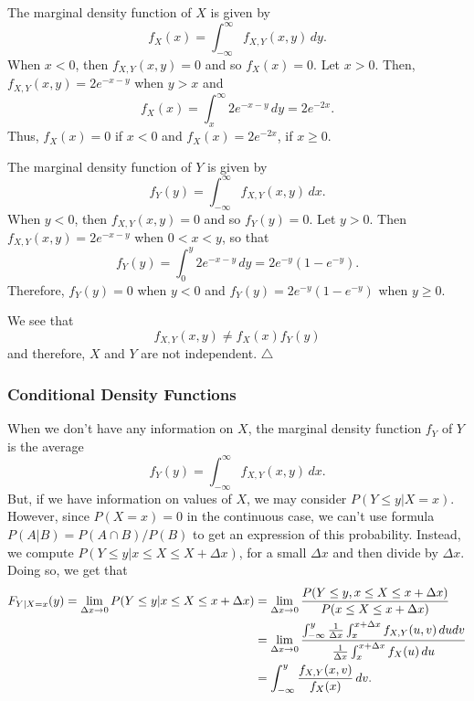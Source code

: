\begin{sol*}
The marginal density function of $X$ is given by
    \[
        f_X (x) = \int_{-\infty}^\infty f_{X, Y} (x, y) \, dy .
    \]
When $x < 0$, then $f_{X, Y} (x, y) = 0$ and so $f_X (x) = 0$. Let $x > 0$. Then, $f_{X, Y} (x, y) = 2 e^{-x - y}$ when $y > x$ and
    \[
        f_X (x) = \int_x^\infty 2e^{-x - y} \, dy = 2e^{-2x} .
    \]
Thus, $f_X (x) = 0$ if $x < 0$ and $f_X (x) = 2e^{-2x}$, if $x \geq 0$. 

The marginal density function of $Y$ is given by
    \[
        f_Y (y) = \int_{-\infty}^\infty f_{X, Y} (x, y) \, dx .
    \]
When $y < 0$, then $f_{X, Y} (x, y) = 0$ and so $f_Y (y) = 0$. Let $y > 0$. Then $f_{X, Y} (x, y) = 2e^{-x - y}$ when $0 < x < y$, so that
    \[
        f_Y (y) = \int_0^y 2e^{-x - y} \, dy = 2e^{-y} (1 - e^{-y} ) .
    \]
Therefore, $f_Y (y) = 0$ when $y < 0$ and $f_Y (y) = 2e^{-y} (1 - e^{-y})$ when $y \geq 0$. 

We see that
    \[
        f_{X, Y} (x, y) \neq f_X (x) f_Y (y)
    \]
and therefore, $X$ and $Y$ are not independent. \hfill $\triangle$
\end{sol*}

\subsubsection*{Conditional Density Functions}
When we don't have any information on $X$, the marginal density function $f_Y$ of $Y$ is the average
    \[
        f_Y (y) = \int_{-\infty}^\infty f_{X, Y} (x, y) \, dx .
    \]
But, if we have information on values of $X$, we may consider $P (Y \leq y | X = x)$. However, since $P (X = x) = 0$ in the continuous case, we can't use formula $P (A|B) = P (A \cap B)/ P(B)$ to get an expression of this probability. Instead, we compute $P (Y \leq y | x \leq X \leq X + \Delta x )$, for a small $\Delta x$ and then divide by $\Delta x$. Doing so, we get that
    \begin{align*}
        F_{Y | X = x} (y) = \lim_{\Delta x \rightarrow 0 } P (Y \leq y | x \leq X \leq x + \Delta x ) &= \lim_{\Delta x \rightarrow 0} \frac{P (Y \leq y , x \leq X \leq x + \Delta x)}{P (x \leq X \leq x + \Delta x )} \\
        &= \lim_{\Delta x \rightarrow 0} \frac{\int_{-\infty}^y \frac{1}{\Delta x}\int_{x}^{x + \Delta x} f_{X, Y} (u, v) \, du dv}{ \frac{1}{\Delta x}\int_x^{x + \Delta x} f_X (u) \, du} \\
        &= \int_{-\infty}^y \frac{f_{X, Y} (x, v)}{f_X (x)} \, dv .
    \end{align*}

